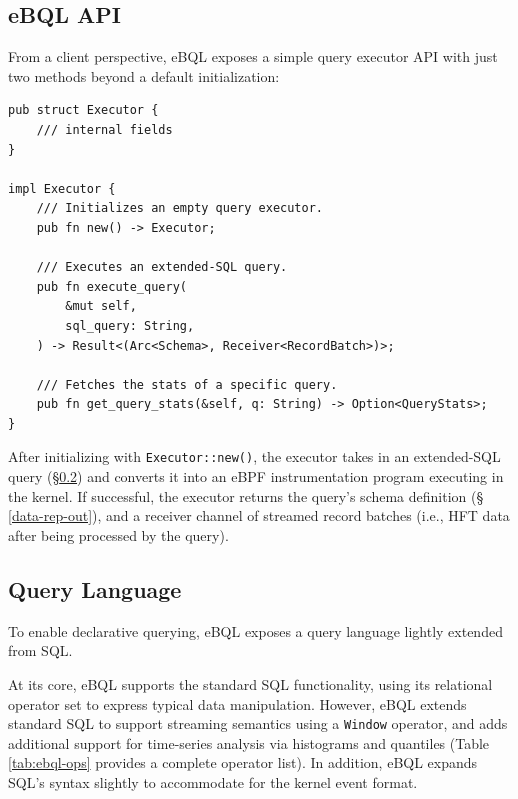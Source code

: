\subsection{eBQL API}
\label{ebql-api}

From a client perspective, eBQL exposes a simple query executor API with just two methods beyond a
default initialization: %

\begin{lstlisting}
pub struct Executor {
    /// internal fields
}

impl Executor {
    /// Initializes an empty query executor.
    pub fn new() -> Executor;

    /// Executes an extended-SQL query.
    pub fn execute_query(
        &mut self,
        sql_query: String,
    ) -> Result<(Arc<Schema>, Receiver<RecordBatch>)>;

    /// Fetches the stats of a specific query.
    pub fn get_query_stats(&self, q: String) -> Option<QueryStats>;
}
\end{lstlisting}

After initializing with \texttt{Executor::new()}, the executor takes in an extended-SQL query
(\S \ref{query-language}) and converts it into an eBPF instrumentation program executing in the
kernel. If successful, the executor returns the query's schema definition (\S 
\ref{data-rep-out}), and a receiver channel of streamed record batches (i.e., HFT data after being
processed by the query).


\subsection{Query Language}
\label{query-language}

To enable declarative querying, eBQL exposes a query language lightly extended from SQL.

At its core, eBQL supports the standard SQL functionality, using its relational operator set to
express typical data manipulation. However, eBQL extends standard SQL to support streaming semantics
using a \texttt{Window} operator, and adds additional support for time-series analysis via
histograms and quantiles (Table \ref{tab:ebql-ops} provides a complete operator list). In addition,
eBQL expands SQL’s syntax slightly to accommodate for the kernel event format.

